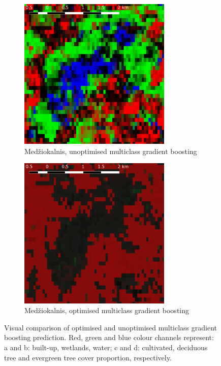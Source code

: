 \documentclass[a4paper,12pt]{scrbook}
\begin{document}
\begin{figure}
  \begin{subfigure}[b]{0.48\textwidth}
    \centering
    \includegraphics[width=0.8\textwidth]{thesis-figures/figures-qgis/medziokalnis-gbu}
    \caption{Med\v{z}iokalnis, unoptimised multiclass gradient boosting}
  \end{subfigure} \hfill
  \begin{subfigure}[b]{0.48\textwidth}
    \centering
    \includegraphics[width=0.8\textwidth]{thesis-figures/figures-qgis/medziokalnis-gbo}
    \caption{Med\v{z}iokalnis, optimised multiclass gradient boosting}
  \end{subfigure}
  \caption{Visual comparison of optimised and unoptimised multiclass gradient boosting prediction. Red, green and blue colour channels represent: a and b: built-up, wetlands, water; c and d: cultivated, deciduous tree and evergreen tree cover proportion, respectively.}
  \label{fig-gradientboost-comparison}
\end{figure}
\end{document}
